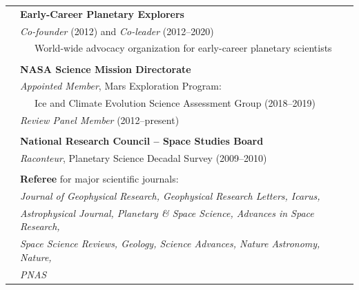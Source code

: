 \documentclass[letterpaper,10pt,twoside]{article}
\begin{document}
\begin{tabular}{@{} l l}
 & \textbf{Early-Career Planetary Explorers} \\
 & \textit{Co-founder} (2012) and \textit{Co-leader} (2012--2020) \\
 & ~~~World-wide advocacy organization for early-career planetary scientists \\
 & \\
 & \textbf{NASA Science Mission Directorate} \\
 & \textit{Appointed Member}, Mars Exploration Program: \\ 
 & ~~~Ice and Climate Evolution Science Assessment Group (2018--2019) \\
 & \textit{Review Panel Member} (2012--present) \\
 & \\
 & \textbf{National Research Council -- Space Studies Board}\\
 & \textit{Raconteur}, Planetary Science Decadal Survey (2009--2010)\\
 & \\
 & \textbf{Referee} for major scientific journals: \\
 & \textit{Journal of Geophysical Research, Geophysical Research Letters, Icarus,} \\
 & \textit{Astrophysical Journal, Planetary \& Space Science, Advances in Space Research,} \\
 & \textit{Space Science Reviews, Geology, Science Advances, Nature Astronomy, Nature,} \\
 & \textit{PNAS} \\
\end{tabular}

\vspace{0.05in}
\end{document}
